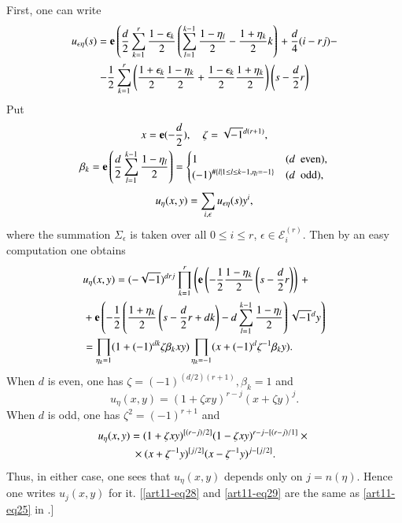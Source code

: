 First, one can write
\begin{gather*}
u_{\epsilon\eta}(s)=\mathbf{e}\left(\dfrac{d}{2}\sum\limits^{r}_{k=1}\frac{1-\epsilon_{k}}{2}\left(\sum\limits^{k-1}_{l=1}\frac{1-\eta_{l}}{2}-\frac{1+\eta_{k}}{2}k\right)\right.+\frac{d}{4}(i-rj)-\\
-\frac{1}{2}\sum\limits^{r}_{k=1}\left(\frac{1+\epsilon_{k}}{2}\frac{1-\eta_{k}}{2}+\frac{1-\epsilon_{k}}{2}\frac{1+\eta_{k}}{2}\right)\left(s-\frac{d}{2}r\right)
\end{gather*}
Put
\begin{gather*}
x=\mathbf{e}(-\frac{d}{2}),\quad \zeta=\sqrt{-1}^{d(r+1)},\\
\beta_{k}=\mathbf{e}\left(\dfrac{d}{2}\sum\limits^{k-1}_{l=1}\frac{1-\eta_{l}}{2}\right)=
\begin{cases}
1 & (d\text{~ even}),\\
(-1)^{\# \{l|1\leq l\leq k-1,\eta_{l}=-1\}} & (d\text{~ odd}),
\end{cases}\\[4pt]
u_{\eta}(x,y)=\sum\limits_{i,\epsilon}u_{\epsilon\eta}(s)y^{i}, 
\end{gather*}
where the summation $\Sigma_{\epsilon}$ is taken over all $0\leq i\leq r$, $\epsilon\in \mathscr{E}^{(r)}_{i}$. Then by an easy computation one obtains
\begin{align*}
& u_{\eta}(x,y)=(-\sqrt{-1})^{drj}\prod\limits^{r}_{k=1}\left(\mathbf{e}\left(-\frac{1}{2}\frac{1-\eta_{k}}{2}\left(s-\dfrac{d}{2}r\right)\right)\right.+{}\\
&{}+\mathbf{e} \left(-\frac{1}{2}\left(\frac{1+\eta_{k}}{2}\left(s-\frac{d}{2}r+dk\right)-d\sum\limits^{k-1}_{l=1}\frac{1-\eta_{l}}{2}\right)\sqrt{-1}^{d}y\right)\\
&= \prod\limits_{\eta_{k}=1}(1+(-1)^{dk}\zeta\beta_{k}xy)\prod\limits_{\eta_{k}=-1}(x+(-1)^{d}\zeta^{-1}\beta_{k}y).
\end{align*}
When $d$ is even, one has $\zeta=(-1)^{(d/2)(r+1)},\beta_{k}=1$ and
\begin{equation}
u_{\eta}(x,y)=(1+\zeta xy)^{r-j}(x+\zeta y)^{j}.\label{art11-eq28}
\end{equation}
When $d$ is odd, one has $\zeta^{2}=(-1)^{r+1}$ and 
\begin{gather}
u_{\eta}(x,y)=(1+\zeta xy)^{[(r-j)/2]}(1-\zeta xy)^{r-j-[(r-j)/1]}\times{}\label{art11-eq29}\\
{}\times (x+\zeta^{-1}y)^{[j/2]}(x-\zeta^{-1}y)^{j-[j/2]}.\notag
\end{gather}\pageoriginale
Thus, in either case, one sees that $u_{\eta}(x,y)$ depends only on $j=n(\eta)$. Hence one writes $u_{j}(x,y)$ for it. [\eqref{art11-eq28} and \eqref{art11-eq29} are the same as \eqref{art11-eq25} in \cite{art11-keySF}.]

